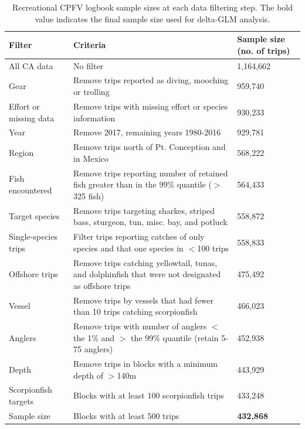 \documentclass[12pt,]{article}
\begin{document}
\begin{table}[ht]
\centering
\caption{Recreational CPFV logbook sample 
                                          sizes at each data filtering step.  
                                          The bold value indicates the final sample size 
                                          used for delta-GLM analysis.} 
\label{tab:Fleet5_RecPC_CPFVlogbook_filter}
\begin{tabular}{>{\raggedright}p{1.5in}>{\raggedright}p{3in}>{\raggedright}p{1in}}
  \hline
Filter & Criteria & Sample size (no. of trips) \\ 
  \hline
All CA data & No filter & 1,164,662 \\ 
  Gear & Remove trips reported as diving, mooching or trolling & 959,740 \\ 
  Effort or missing data & Remove trips with missing effort or species information & 930,233 \\ 
  Year & Remove 2017, remaining years 1980-2016 & 929,781 \\ 
  Region & Remove trips north of Pt. Conception and in Mexico & 568,222 \\ 
  Fish encountered & Remove trips reporting number of retained fish greater than in the 99\% quantile ($>$325 fish) & 564,433 \\ 
  Target species & Remove trips targeting sharkes, striped bass, sturgeon, tun, misc. bay, and potluck & 558,872 \\ 
  Single-species trips & Filter trips reporting catches of only species and that one species in $<$100 trips & 558,833 \\ 
  Offshore trips & Remove trips catching yellowtail, tunas, and dolphinfish that were not designated as offshore trips & 475,492 \\ 
  Vessel & Remove trips by vessels that had fewer than 10 trips catching scorpionfish & 466,023 \\ 
  Anglers & Remove trips with number of anglers $<$ the 1\% and $>$ the 99\% quantile (retain 5-75 anglers) & 452,938 \\ 
  Depth & Remove trips in blocks with a minimum depth of $>$140m & 443,929 \\ 
  Scorpionfish targets & Blocks with at least 100 scorpionfish trips & 433,248 \\ 
  Sample size & Blocks with at least 500 trips & \textbf{432,868} \\ 
   \hline
\end{tabular}
\end{table}\begin{table}[ht]

\end{table}
\end{document}

